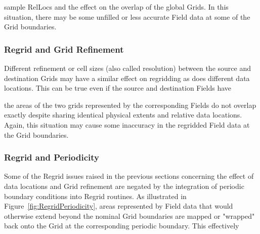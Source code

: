 
sample RelLocs and the effect on the overlap of the global Grids.  In this
situation, there may be some unfilled or less accurate Field data at some of the
Grid boundaries.


\subsubsection{Regrid and Grid Refinement}

Different refinement or cell sizes (also called resolution) between the source
and destination Grids may have a similar effect on regridding as does different
data locations. This can be true even if the source and destination Fields have


the areas of the two grids represented by the corresponding Fields do not overlap
exactly despite sharing identical physical extents and relative data locations.
Again, this situation may cause some inaccuracy in the regridded Field data at
the Grid boundaries.


\subsubsection{Regrid and Periodicity}

Some of the Regrid issues raised in the previous sections concerning the effect
of data locations and Grid refinement are negated by the integration of
periodic boundary conditions into Regrid routines.  As illustrated in
Figure~\ref{fig:RegridPeriodicity}, areas represented by Field data that
would otherwise extend beyond the nominal Grid boundaries are mapped or "wrapped"
back onto the Grid at the corresponding periodic boundary.  This effectively 

